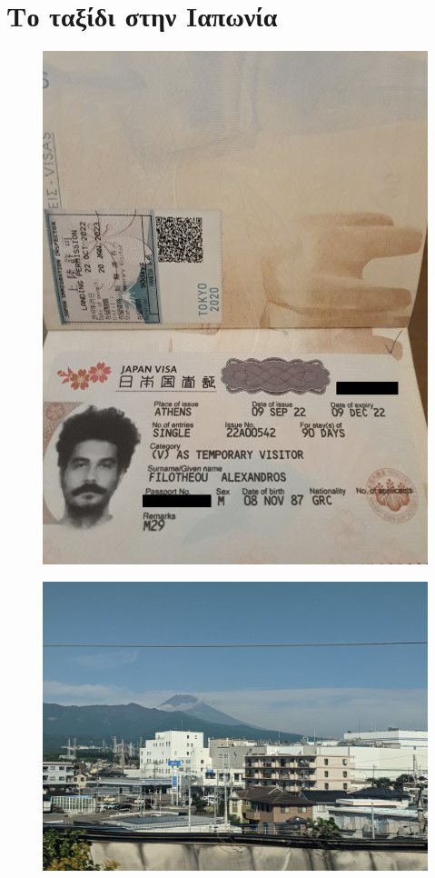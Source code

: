 \section{Το ταξίδι στην Ιαπωνία}
\begin{figure}[H]\centering
  \includegraphics[scale=0.25]{./figures/parts/appendix/chapters/06/visa.jpg}
\end{figure}
\begin{figure}[H]\centering
  \includegraphics[scale=0.25]{./figures/parts/appendix/chapters/06/fuji_from_train.jpg}
\end{figure}
